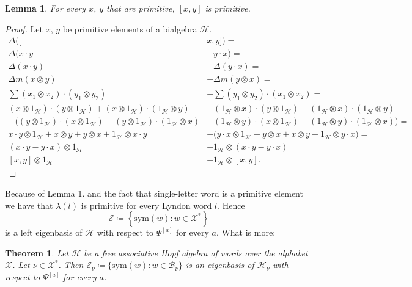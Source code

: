\documentclass[a4paper, 12pt]{article}
\newtheorem{theorem}{Theorem}
\newtheorem{lemma}{Lemma}
\begin{document}
\begin{lemma}
For every $x$, $y$ that are primitive, $[x, y]$ is primitive.
\end{lemma}

\begin{proof}
Let $x$, $y$ be primitive elements of a bialgebra $\mathcal{H}$.
\begin{align*}
\Delta([&x, y]) = \\ \Delta(x\cdot y &- y\cdot x) =\\ \Delta (x\cdot y) &- \Delta(y\cdot x) =\\
\Delta m(x \otimes y) &- \Delta m(y \otimes x) =\\
\sum (x_1 \otimes x_2) \cdot (y_1 \otimes y_2) &- \sum (y_1 \otimes y_2) \cdot (x_1 \otimes x_2) = \\
(x \otimes 1_\mathcal{H}) \cdot (y \otimes 1_\mathcal{H}) + (x \otimes 1_\mathcal{H}) \cdot (1_\mathcal{H}
\otimes y)
&+ (1_\mathcal{H} \otimes x) \cdot (y \otimes 1_\mathcal{H}) + (1_\mathcal{H} \otimes x) \cdot
(1_\mathcal{H} \otimes y) + \\
- \Big((y \otimes 1_\mathcal{H}) \cdot (x \otimes 1_\mathcal{H}) + (y \otimes 1_\mathcal{H}) \cdot
(1_\mathcal{H} \otimes x)
&+ (1_\mathcal{H} \otimes y) \cdot (x \otimes 1_\mathcal{H}) + (1_\mathcal{H} \otimes y) \cdot
(1_\mathcal{H} \otimes x) \Big) = \\
x \cdot y \otimes 1_\mathcal{H} + x \otimes y + y \otimes x + 1_\mathcal{H} \otimes x \cdot y
&- \Big( y \cdot x \otimes 1_\mathcal{H} + y \otimes x + x \otimes y + 1_\mathcal{H} \otimes y \cdot x
\Big) = \\
(x \cdot y - y \cdot x) \otimes 1_\mathcal{H} &+ 1_\mathcal{H} \otimes (x \cdot y - y \cdot x) = \\
[x, y] \otimes 1_\mathcal{H} &+ 1_\mathcal{H} \otimes [x, y].
\end{align*}

\end{proof}

Because of Lemma 1. and the fact that single-letter word is a primitive element we have that $\lambda(l)$ is
primitive
for every Lyndon word $l$. Hence
\begin{equation*}
\mathcal{E} \coloneqq\left\{\mathrm{sym}(w) : w \in \mathcal{X}^*\right\}
\end{equation*}
is a left eigenbasis of $\mathcal{H}$ with respect to $\Psi^{[a]}$ for every $a$. What is more:

\begin{theorem}
Let $\mathcal{H}$ be a free associative Hopf algebra of words over the alphabet $\mathcal{X}$.
Let $\nu \in \mathcal{X}^*$. Then $\mathcal{E}_\nu \coloneqq \{\mathrm{sym}(w) : w \in \mathcal{B}_\nu\}$ is
an eigenbasis of
$\mathcal{H}_\nu$ with respect to $\Psi^{[a]}$ for every $a$.
\end{theorem}
\end{document}
